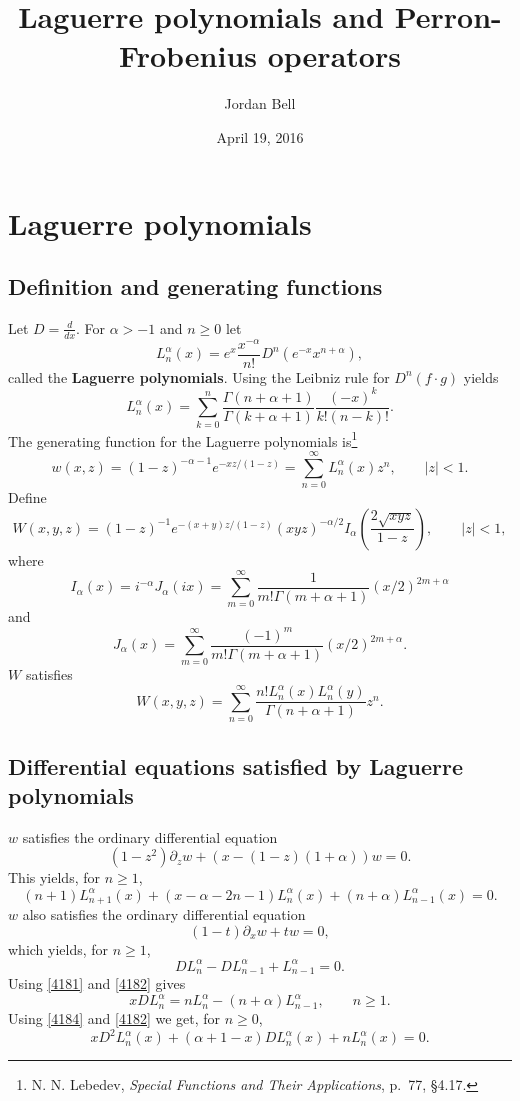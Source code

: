 \documentclass{article}
\theoremstyle{definition}
\begin{document}
\title{Laguerre polynomials and Perron-Frobenius operators}
\author{Jordan Bell}
\date{April 19, 2016}

\maketitle

\section{Laguerre polynomials}
\subsection{Definition and generating functions}
Let $D=\frac{d}{dx}$. For $\alpha>-1$ and $n \geq 0$ let
\[
L_n^\alpha(x) = e^x \frac{x^{-\alpha}}{n!} D^n(e^{-x}x^{n+\alpha}),
\]
called the \textbf{Laguerre polynomials}.
Using the Leibniz rule for $D^n(f \cdot g)$ yields
\[
L_n^\alpha(x)=\sum_{k=0}^n \frac{\Gamma(n+\alpha+1)}{\Gamma(k+\alpha+1)} \frac{(-x)^k}{k!(n-k)!}.
\]
The generating function for the Laguerre polynomials is\footnote{N. N. Lebedev,
{\em Special Functions and Their Applications},
p.~77, \S 4.17.}
\[
w(x,z) = (1-z)^{-\alpha-1} e^{-xz/(1-z)} = \sum_{n=0}^\infty L_n^\alpha(x) z^n,\qquad
|z|<1.
\]
Define
\[
W(x,y,z) = (1-z)^{-1} e^{-(x+y)z/(1-z)} (xyz)^{-\alpha/2} I_\alpha \left( \frac{2 \sqrt{xyz}}{1-z} \right),
\qquad |z|<1,
\]
where 
\[
I_\alpha(x)=i^{-\alpha} J_\alpha(ix) = \sum_{m=0}^\infty \frac{1}{m! \Gamma(m+\alpha+1)} (x/2)^{2m+\alpha}
\]
and
\[
J_\alpha(x) = \sum_{m=0}^\infty \frac{(-1)^m}{m! \Gamma(m+\alpha+1)} (x/2)^{2m+\alpha}.
\]
$W$ satisfies
\[
W(x,y,z) = \sum_{n=0}^\infty 
\frac{n! L_n^\alpha(x) L_n^\alpha(y)}{\Gamma(n+\alpha+1)} z^n.
\]



\subsection{Differential equations satisfied by Laguerre polynomials}
$w$ satisfies the ordinary differential equation
\[
(1-z^2) \partial_z w + (x-(1-z)(1+\alpha))w=0.
\]
This yields, for $n \geq 1$,
\begin{equation}
(n+1)L_{n+1}^\alpha(x)+(x-\alpha-2n-1)L_n^\alpha(x)+(n+\alpha)L_{n-1}^\alpha(x)=0.
\label{4181}
\end{equation}
$w$ also satisfies the ordinary differential equation
\[
(1-t)\partial_x w + tw=0,
\]
which yields, for $n \geq 1$,
\begin{equation}
DL_n^\alpha-DL_{n-1}^\alpha + L_{n-1}^\alpha=0.
\label{4182}
\end{equation}
Using \eqref{4181} and \eqref{4182} gives
\begin{equation}
xDL_n^\alpha = n L_n^\alpha-(n+\alpha)L_{n-1}^\alpha,
\qquad n \geq 1.
\label{4184}
\end{equation}
Using \eqref{4184} and \eqref{4182} we get, for $n \geq 0$,
\begin{equation}
x D^2 L_n^\alpha(x)+(\alpha+1-x)DL_n^\alpha(x)+nL_n^\alpha(x)=0.
\label{4187}
\end{equation}
\end{document}
